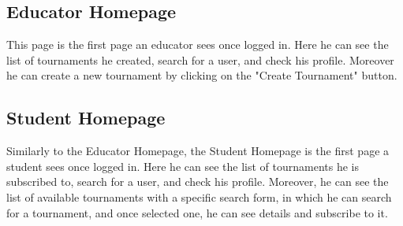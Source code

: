 \subsection{Educator Homepage}
This page is the first page an educator sees once logged in. Here he can see the list of tournaments he created, search for a user, and check his profile. Moreover he can create a new tournament by clicking on the "Create Tournament" button.\\
\clearpage
\subsection{Student Homepage}
Similarly to the Educator Homepage, the Student Homepage is the first page a student sees once logged in. Here he can see the list of tournaments he is subscribed to, search for a user, and check his profile. Moreover, he can see the list of available tournaments with a specific search form, in which he can search for a tournament, and once selected one, he can see details and subscribe to it.\\
\clearpage
